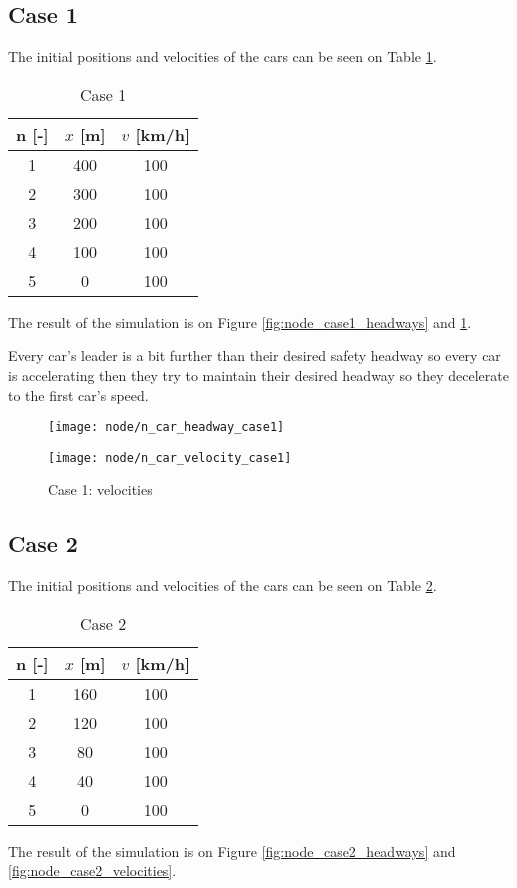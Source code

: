 		\subsection*{Case 1}
		The initial positions and velocities of the cars can be seen on Table \ref{tab:node_case1}.
		\begin{table}[ht]
			\centering
			\begin{tabular}{ |c|c|c| }
				\hline
				n [-] & $x$ [m] & $v$ [km/h]\\
				\hline
				1 & 400 & 100 \\
				2 & 300 & 100 \\
				3 & 200 & 100 \\
				4 & 100 & 100 \\
				5 & 0 & 100 \\
				\hline
			\end{tabular}
			\caption{Case 1}
			\label{tab:node_case1}
		\end{table}
		The result of the simulation is on Figure \ref{fig:node_case1_headways} and \ref{fig:node_case1_velocities}. 

		Every car's leader is a bit further than their desired safety headway so every car is accelerating then they try to maintain their desired headway so they decelerate to the first car's speed.
		\begin{figure}
			\centering
			\begin{minipage}{.5\textwidth}
				\centering
				\texttt{[image: node/n\_car\_headway\_case1]}
				\caption{Case 1: headways}
				\label{fig:node_case1_headways}
			\end{minipage}\hfill
			\begin{minipage}{.5\textwidth}
				\centering
				\texttt{[image: node/n\_car\_velocity\_case1]}
				\caption{Case 1: velocities}
				\label{fig:node_case1_velocities}
			\end{minipage}
		\end{figure}
		\subsection*{Case 2}
		The initial positions and velocities of the cars can be seen on Table \ref{tab:node_case2}.
		\begin{table}
			\centering
			\begin{tabular}{ |c|c|c| }
				\hline
				n [-] & $x$ [m] & $v$ [km/h]\\
				\hline
				1 & 160 & 100 \\
				2 & 120 & 100 \\
				3 & 80 & 100 \\
				4 & 40 & 100 \\
				5 & 0 & 100 \\
				\hline
			\end{tabular}
			\caption{Case 2}
			\label{tab:node_case2}
		\end{table}
		The result of the simulation is on  Figure \ref{fig:node_case2_headways} and \ref{fig:node_case2_velocities}. 

